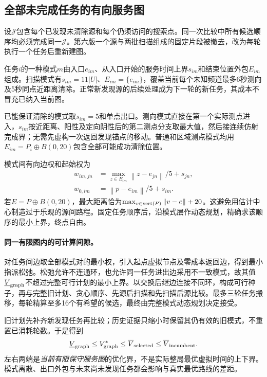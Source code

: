 \documentclass[UTF8,a4paper,zihao=-4,fontset=windows]{ctexart}
\newcommand{\norm}[1]{\left\lVert#1\right\rVert}
\begin{document}
\subsection{全部未完成任务的有向服务图}
设$\mathcal J$包含每个已发现未清除源和每个仍须访问的搜索点。同一次比较中所有候选顺序均必须完成同一$\mathcal J$。第六版一个源与两批扫描组成的固定片段被撤去，改为每轮执行一个任务后重新建图。

任务$i$的一种模式$m$由入口$e_{im}$、从入口开始的服务时间上界$s_{im}$和结束位置外包$E_{im}$组成。扫描模式有$s_{im}=11|U|$、$E_{im}=\{e_{im}\}$，覆盖当前每个未知频道最多6秒测向及5秒同点近距离清除。正常新发现源的后续处理成为下一轮的新任务，其成本不冒充已纳入当前图。

已能保证清除的模式取$s_{im}=5$和单点出口。测向模式直接在第一个实际测点进入，$s_{im}$按近距离、阳性及定向阴性后的第二测点分支取最大值，然后接连续仿射完成界；无需先虚构一次返回发现锚点的移动。普通和区域测点模式均用$E_{im}=P_i\oplus B(0,20)$包含全部可能成功清除位置。

模式间有向边权和起始权为
\begin{align}
w_{im,jn}&=\max_{z\in E_{im}}\norm{z-e_{jn}}/5+s_{jn},\\
w_{0,im}&=\norm{p-e_{im}}/5+s_{im}.
\end{align}
若$E=P\oplus B(0,20)$，最大距离恰为$\max_{v\in{\rm vert}(P)}\norm{v-e}+20$。这避免用估计中心制造过于乐观的源间路程。固定任务顺序后，沿模式层作动态规划，精确求该顺序的最小上界，终点自由。

\paragraph{同一有限图内的可计算间隙。}
对任务间边取全部模式对的最小权，引入起点虚拟节点及零成本返回边，得到最小指派松弛。松弛允许不连通环，也允许同一任务进出边采用不一致模式，故其值$\underline V_{\rm graph}$不超过完整可行计划的最小上界。以交换后继边连接不同环，构成可行种子，再与完整旧计划、贪心顺序、先源后扫描和先扫描后源比较。最多三轮任务搬移，每轮精算至多16个有希望的候选，最终由完整模式动态规划决定接受。

旧计划先补齐新发现任务再比较；历史证据只缩小时保留其仍有效的旧模式，不重置已消耗轮数。于是得到
\[
\underline V_{\rm graph}\le V_{\rm graph}^*\le
\overline V_{\rm selected}\le\overline V_{\rm incumbent}.
\]
左右两端是\emph{当前有限保守服务图}的优化界，不是实际整局最优虚拟时间的上下界。模式离散、出口外包与未来尚未发现任务都会影响与真实最优路线的差距。
\end{document}
